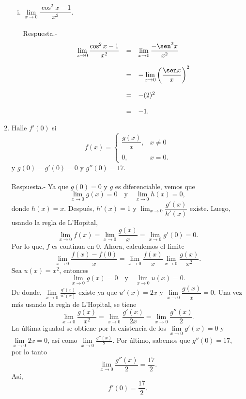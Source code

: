\begin{enumerate}[\bfseries 1.]
\begin{enumerate}[(i)]
	    \item $\lim\limits_{x\to 0}\dfrac{\cos^2 x - 1}{x^2}$.\\\\
		Respuesta.-\; 
		$$
		\begin{array}{rcl}
		    \lim\limits_{x\to 0}\dfrac{\cos^2 x - 1}{x^2}&=& \lim\limits_{x\to 0} \dfrac{-\sen^2 x}{x^2}\\\\ 
								 &=& -\lim\limits_{x\to 0}\left(\dfrac{\sen x}{x}\right)^2\\\\
								 &=& - (2)^2\\\\
								 &=& -1.
		\end{array}
		$$
		\vspace{.5cm}
		
	\end{enumerate}

    \item Halle $f'(0)$ si
    $$
    f(x)=
    \left\{
	\begin{array}{rc}
	    \dfrac{g(x)}{x}, & x\neq 0\\\\
	    0, & x=0.
	\end{array}
    \right.
    $$
    y $g(0)=g'(0)=0$ y $g''(0)=17$.\\\\
	Respuesta.-\; Ya que $g(0)=0$ y $g$ es diferenciable, vemos que
	$$\lim_{x\to 0}g(x)=0\quad \mbox{y}\quad \lim_{x\to 0}h(x)=0,$$
	donde $h(x)=x.$ Después, $h'(x)=1$ y $\lim_{x\to 0}\dfrac{g'(x)}{h'(x)}$ existe. Luego, usando la regla de L'Hopital, 
	$$\lim_{x\to 0}f(x)=\lim_{x\to 0}\dfrac{g(x)}{x}=\lim_{x\to 0}g'(0)=0.$$
	Por lo que, $f$ es continua en $0$. Ahora, calculemos el límite
	$$\lim_{x\to 0}\dfrac{f(x)-f(0)}{x}=\lim_{x\to 0}\dfrac{f(x)}{x}\lim_{x\to 0}\dfrac{g(x)}{x^2}.$$
	Sea $u(x)=x^2$, entonces
	$$\lim_{x\to 0}g(x)=0 \quad \mbox{y}\quad \lim_{x\to 0}u(x)=0.$$
	De donde, $\lim\limits_{x\to 0}\frac{g'(x)}{u'(x)}$ existe ya que $u'(x)=2x$ y $\lim\limits_{x\to 0}\dfrac{g(x)}{x}=0$. Una vez más usando la regla de L'Hopital, se tiene
	$$\lim_{x\to 0}\dfrac{g(x)}{x^2}=\lim_{x\to 0}\dfrac{g'(x)}{2x}=\lim_{x\to 0}\dfrac{g''(x)}{2}.$$
	La última igualad se obtiene por la existencia de los $\lim\limits_{x\to 0}g'(x)=0$ y $\lim\limits_{x\to 0}2x=0$, así como $\lim\limits_{x\to 0}\frac{g''(x)}{2}$. Por último, sabemos que $g''(0)=17$, por lo tanto
	$$\lim_{x\to 0}\dfrac{g''(x)}{2}=\dfrac{17}{2}.$$
	Así,
	$$f'(0)=\dfrac{17}{2}.$$\\


\end{enumerate}
